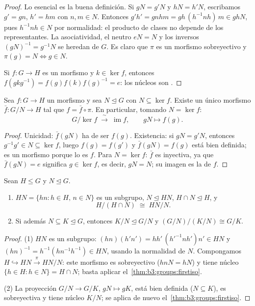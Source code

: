\begin{proof}
Lo esencial es la buena definición. Si $gN = g'N$ y $hN = h'N$,
escribamos $g' = gn$, $h' = hm$ con $n, m \in N$. Entonces
$g'h' = gnhm =
gh\,(h^{-1}nh)\,m \in ghN$, pues $h^{-1}nh \in N$ por normalidad: el
producto de clases no depende de los representantes. La asociatividad,
el neutro $eN = N$ y los inversos $(gN)^{-1} = g^{-1}N$ se heredan de
$G$. Es claro que $\pi$ es un morfismo sobreyectivo y
$\pi(g) = N \iff g \in N$.

Si $f \colon G \to H$ es un morfismo y $k \in \ker f$, entonces
$f(gkg^{-1}) = f(g)f(k)f(g)^{-1} = e$: los núcleos son
.
\end{proof}

\begin{theorem}
\label{thm:b3:groups:firstiso}
Sea $f \colon G \to H$ un morfismo y sea $N \trianglelefteq G$ con
$N \subseteq \ker f$. Existe un único morfismo $\bar f \colon G/N
\to H$ tal que $f = \bar f \circ \pi$. En particular, tomando $N = \ker
f$:
\[
G/\ker f \;\xrightarrow{\;\sim\;}\; \operatorname{im} f,
\qquad gN \mapsto f(g).
\]
\end{theorem}

\begin{proof}
Unicidad: $\bar f(gN)$ ha de ser $f(g)$. Existencia: si $gN = g'N$,
entonces $g^{-1}g' \in N \subseteq \ker f$, luego $f(g) = f(g')$ y $\bar
f(gN) = f(g)$ está bien definida; es un morfismo porque lo es $f$. Para
$N = \ker f$: $\bar f$ es inyectiva, ya que $\bar f(gN) = e$ significa
$g \in \ker f$, es decir, $gN = N$; su imagen es la de $f$.
\end{proof}

\begin{theorem}
\label{thm:b3:groups:secondiso}
Sean $H \leq G$ y $N \trianglelefteq G$.
\begin{enumerate}
  \item $HN = \{hn : h \in H,\, n \in N\}$ es un subgrupo, $N
        \trianglelefteq HN$, $H \cap N \trianglelefteq H$, y
        \[
        H/(H \cap N) \;\cong\; HN/N .
        \]
  \item Si además $N \subseteq K \trianglelefteq G$, entonces $K/N
        \trianglelefteq G/N$ y $(G/N)\big/(K/N) \cong G/K$.
\end{enumerate}
\end{theorem}

\begin{proof}
(1) $HN$ es un subgrupo: $(hn)(h'n') = hh'\,(h'^{-1}nh')n' \in HN$ y
$(hn)^{-1} = h^{-1}(hn^{-1}h^{-1}) \in HN$, usando la normalidad de $N$.
Compongamos $H \hookrightarrow HN \xrightarrow{\pi} HN/N$: este morfismo
es sobreyectivo ($hnN = hN$) y tiene núcleo $\{h \in H : h \in
N\} = H \cap N$; basta aplicar el~\cref{thm:b3:groups:firstiso}.

(2) La proyección $G/N \to G/K$, $gN \mapsto gK$, está bien definida
($N \subseteq K$), es sobreyectiva y tiene núcleo $K/N$; se aplica de
nuevo el~\cref{thm:b3:groups:firstiso}.
\end{proof}

